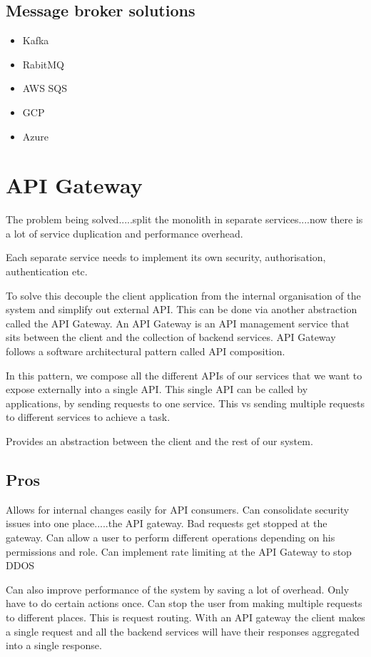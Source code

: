 \subsection{Message broker solutions}
\begin{itemize}
    \item Kafka
    \item RabitMQ
    \item AWS SQS
    \item GCP
    \item Azure %
\end{itemize}


\section{API Gateway}

The problem being solved.....split the monolith in separate services....now there is a lot of service duplication and performance overhead.

Each separate service needs to implement its own security, authorisation, authentication etc.

To solve this decouple the client application from the internal organisation of the system and simplify out external API\@.
This can be done via another abstraction called the API Gateway.
An API Gateway is an API management service that sits between the client and the collection of backend services.
API Gateway follows a software architectural pattern called API composition.

In this pattern, we compose all the different APIs of our services that we want to expose externally into a single API\@.
This single API can be called by applications, by sending requests to one service.
This vs sending multiple requests to different services to achieve a task.

Provides an abstraction between the client and the rest of our system.

\subsection{Pros}
Allows for internal changes easily for API consumers.
Can consolidate security issues into one place.....the API gateway.
Bad requests get stopped at the gateway.
Can allow a user to perform different operations depending on his permissions and role.
Can implement rate limiting at the API Gateway to stop DDOS

Can also improve performance of the system by saving a lot of overhead.
Only have to do certain actions once.
Can stop the user from making multiple requests to different places.
This is request routing.
With an API gateway the client makes a single request and all the backend services will have their responses aggregated into a single response.

